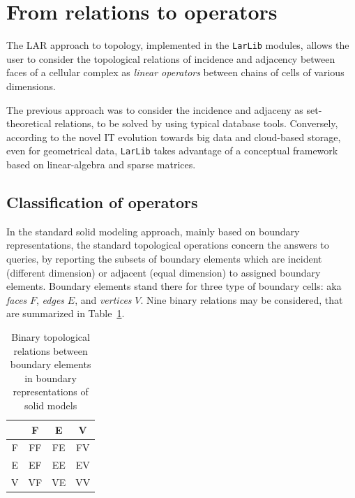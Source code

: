 \documentclass[11pt,oneside]{article}	%
\begin{document}
\section{From relations to operators}

The LAR approach to topology, implemented in the \texttt{LarLib} modules, allows the user to consider the topological relations of incidence and adjacency between faces of a cellular complex as \emph{linear operators} between chains of cells of various dimensions. 

The previous approach was to consider the incidence and adjaceny as set-theoretical relations, to be solved by using typical database tools. Conversely, according to the novel IT evolution towards big data and cloud-based storage, even for geometrical data, \texttt{LarLib}  takes advantage of a conceptual framework based on linear-algebra and sparse matrices.

\subsection{Classification of operators} 

In the standard solid modeling approach, mainly based on boundary representations, the standard topological operations concern the answers to queries, by reporting the subsets of boundary elements which are incident (different dimension) or adjacent (equal dimension) to assigned boundary elements. Boundary elements stand there for three type of boundary cells: aka \emph{faces} $F$, \emph{edges} $E$, and \emph{vertices} $V$. Nine binary relations may be considered, that are summarized in Table~\ref{tab:one}.
\begin{table}[htbp]
\caption{Binary topological relations between boundary elements in boundary representations of solid models}
\begin{center}
\begin{tabular}{|c|ccc|}
\hline 
  & F & E & V \\
\hline 
F & FF & FE & FV \\
E & EF & EE & EV \\
V & VF & VE & VV \\
\hline 
\end{tabular}
\end{center}
\label{tab:one}
\end{table}%
\end{document}
